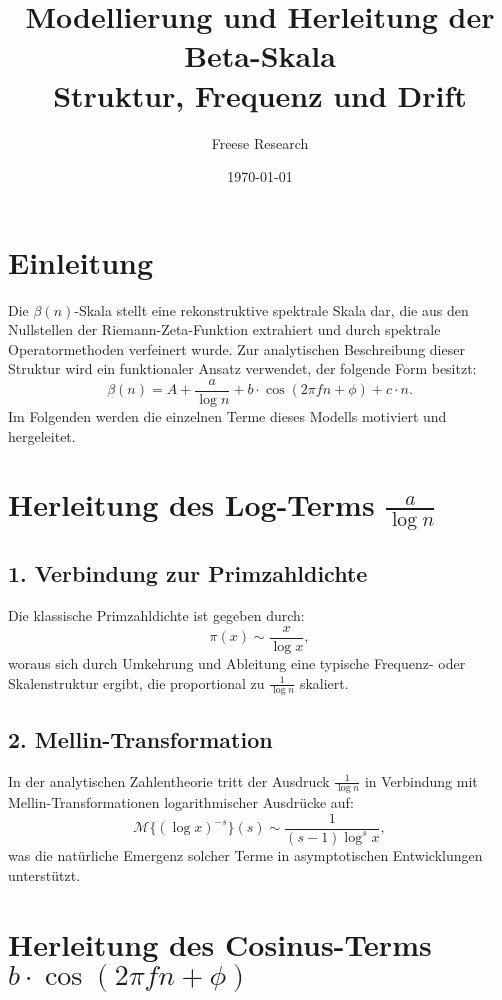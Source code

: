 \documentclass[a4paper,12pt]{article}
\title{Modellierung und Herleitung der Beta-Skala \\[0.5em] \large Struktur, Frequenz und Drift}
\author{Freese Research}
\date{\today}
\begin{document}
\maketitle

\section*{Einleitung}

Die \(\beta(n)\)-Skala stellt eine rekonstruktive spektrale Skala dar, die aus den Nullstellen der Riemann-Zeta-Funktion extrahiert und durch spektrale Operatormethoden verfeinert wurde. 
Zur analytischen Beschreibung dieser Struktur wird ein funktionaler Ansatz verwendet, der folgende Form besitzt:
\[
\beta(n) = A + \frac{a}{\log n} + b \cdot \cos(2\pi f n + \phi) + c \cdot n.
\]
Im Folgenden werden die einzelnen Terme dieses Modells motiviert und hergeleitet.


\section{Herleitung des Log-Terms \(\frac{a}{\log n}\)}

\subsection*{1. Verbindung zur Primzahldichte}

Die klassische Primzahldichte ist gegeben durch:
\[
\pi(x) \sim \frac{x}{\log x},
\]
woraus sich durch Umkehrung und Ableitung eine typische Frequenz- oder Skalenstruktur ergibt, die proportional zu \(\frac{1}{\log n}\) skaliert.

\subsection*{2. Mellin-Transformation}

In der analytischen Zahlentheorie tritt der Ausdruck \(\frac{1}{\log n}\) in Verbindung mit Mellin-Transformationen logarithmischer Ausdrücke auf:
\[
\mathcal{M}\{(\log x)^{-s}\}(s) \sim \frac{1}{(s - 1) \log^s x},
\]
was die natürliche Emergenz solcher Terme in asymptotischen Entwicklungen unterstützt.

\section{Herleitung des Cosinus-Terms \(b \cdot \cos(2\pi f n + \phi)\)}
\end{document}
